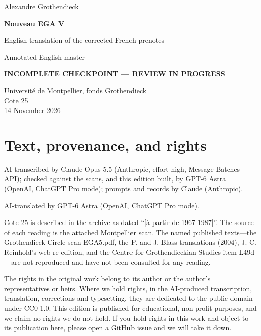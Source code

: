 \documentclass[10pt,a4paper]{article}
\newcommand{\EditionForm}{Annotated English master}
\begin{document}
\hypersetup{pageanchor=false}\begin{titlepage}\thispagestyle{empty}\vspace*{20mm}
{\Large Alexandre Grothendieck\par}\vspace{12mm}
{\Huge\bfseries Nouveau EGA V\par}\vspace{8mm}
{\Large English translation of the corrected French prenotes\par}\vspace{7mm}
{\large\EditionForm\par}\vspace{12mm}
{\large\bfseries\color{deletedred}INCOMPLETE CHECKPOINT — REVIEW IN PROGRESS\par}\vspace{10mm}
Université de Montpellier, fonds Grothendieck\\ Cote 25\\
14 November 2026
\vfill\end{titlepage}\clearpage\hypersetup{pageanchor=true}
\section*{Text, provenance, and rights}
AI-transcribed by Claude Opus 5.5 (Anthropic, effort high, Message Batches API); checked against the scans, and this edition built, by GPT-6 Astra (OpenAI, ChatGPT Pro mode); prompts and records by Claude (Anthropic).

AI-translated by GPT-6 Astra (OpenAI, ChatGPT Pro mode).

Cote 25 is described in the archive as dated ``[à partir de 1967-1987]''. The source of each reading is the attached Montpellier scan. The named published texts---the Grothendieck Circle scan EGA5.pdf, the P. and J. Blass translations (2004), J. C. Reinhold's web re-edition, and the Centre for Grothendieckian Studies item L49d---are not reproduced and have not been consulted for any reading.

The rights in the original work belong to its author or the author's representatives or heirs. Where we hold rights, in the AI-produced transcription, translation, corrections and typesetting, they are dedicated to the public domain under CC0 1.0. This edition is published for educational, non-profit purposes, and we claim no rights we do not hold. If you hold rights in this work and object to its publication here, please open a GitHub issue and we will take it down.
\end{document}
